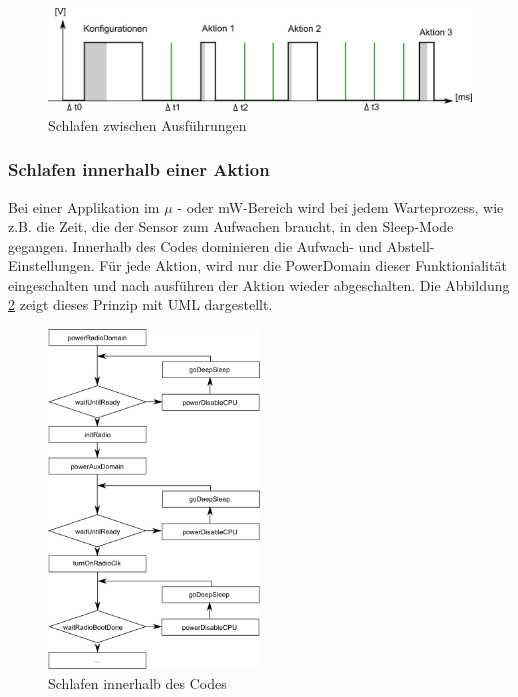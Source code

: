 \begin{figure}[ht]
    \includegraphics[width=\textwidth]{2TheoretischeGrundlagen/imag/SleepGrundprinzip.png}
    \caption{Schlafen zwischen Ausführungen}
    \label{sleep_Grundprinzip} 
\end{figure}

\subsubsection{Schlafen innerhalb einer Aktion}
Bei einer Applikation im $\mu$ - oder mW-Bereich wird bei jedem Warteprozess, wie z.B. die Zeit, die der Sensor zum Aufwachen braucht, in den Sleep-Mode gegangen. Innerhalb des Codes dominieren die Aufwach- und Abstell-Einstellungen. Für jede Aktion, wird nur die PowerDomain dieser Funktionialität eingeschalten und nach ausführen der Aktion wieder abgeschalten. Die Abbildung \ref{sleep_intern} zeigt dieses Prinzip mit UML dargestellt.

\begin{figure}[ht]
    \includegraphics[width=0.5\textwidth]{2TheoretischeGrundlagen/imag/SleepInFunktion.png}
    \caption{Schlafen innerhalb des Codes}
    \label{sleep_intern} 
\end{figure}


